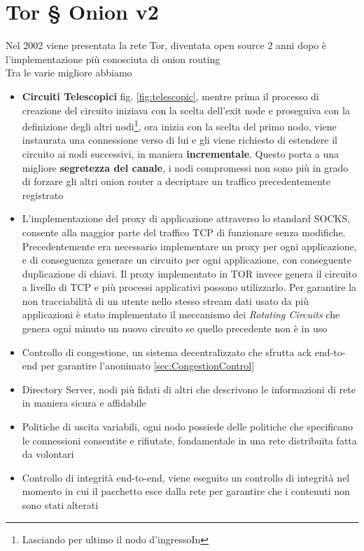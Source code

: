 \newpage
\chapter{Tor § Onion v2}
\label{chap:Capitolo2}
Nel 2002 viene presentata la rete Tor, diventata open source 2 anni dopo è l'implementazione più conosciuta di onion routing \\
Tra le varie migliore abbiamo 
\begin{itemize}
    \item \textbf{Circuiti Telescopici} fig. \ref{fig:telescopic}, mentre prima il processo di creazione del circuito iniziava con la scelta dell'exit node e proseguiva con la definizione degli altri nodi\footnote{Lasciando per ultimo il nodo d'ingressoIn}, ora inizia con la scelta del primo nodo, viene instaurata una connessione verso di lui e gli viene richiesto di estendere il circuito ai nodi successivi, in maniera \textbf{incrementale}. Questo porta a una migliore \textbf{segretezza del canale}, i nodi compromessi non sono più in grado di forzare gli altri onion router a decriptare un traffico precedentemente registrato
    
    \item L'implementazione del proxy di applicazione attraverso lo standard SOCKS, consente alla maggior parte del traffico TCP di funzionare senza modifiche. Precedentemente era necessario implementare un proxy per ogni applicazione, e di conseguenza generare un circuito per ogni applicazione, con conseguente duplicazione di chiavi. Il proxy implementato in TOR invece genera il circuito a livello di TCP e più processi applicativi possono utilizzarlo. Per garantire la non tracciabilità di un utente nello stesso stream dati usato da più applicazioni è stato implementato il meccanismo dei \emph{Rotating Circuits} che genera ogni minuto un nuovo circuito se quello precedente non è in uso
    
    \item Controllo di congestione, un sistema decentralizzato che sfrutta ack end-to-end per garantire l'anonimato \ref{sec:CongestionControl}
    \item Directory Server, nodi più fidati di altri che descrivono le informazioni di rete in maniera sicura e affidabile
    \item Politiche di uscita variabili, ogni nodo possiede delle politiche che specificano le connessioni consentite e rifiutate, fondamentale in una rete distribuita fatta da volontari
    \item Controllo di integrità end-to-end, viene eseguito un controllo di integrità nel momento in cui il pacchetto esce dalla rete per garantire che i contenuti non sono stati alterati
\end{itemize}

